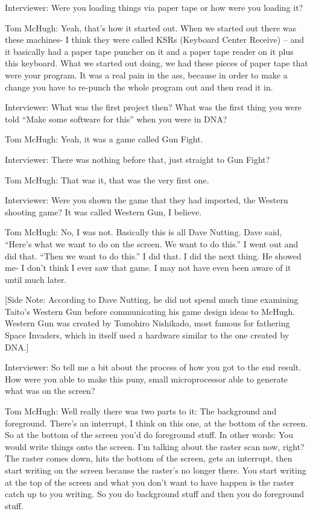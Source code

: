 \textcolor{interviewer}{Interviewer:} Were you loading things via paper tape or how were you loading it?

\textcolor{interviewee}{Tom McHugh:} Yeah, that’s how it started out. When we started out there was these machines- I think they were called KSRs (Keyboard Center Receive) – and it basically had a paper tape puncher on it and a paper tape reader on it plus this keyboard. What we started out doing, we had these pieces of paper tape that were your program. It was a real pain in the ass, because in order to make a change you have to re-punch the whole program out and then read it in.

\textcolor{interviewer}{Interviewer:} What was the first project then? What was the first thing you were told “Make some software for this” when you were in DNA?

\textcolor{interviewee}{Tom McHugh:} Yeah, it was a game called Gun Fight.

\textcolor{interviewer}{Interviewer:} There was nothing before that, just straight to Gun Fight?

\textcolor{interviewee}{Tom McHugh:} That was it, that was the very first one.

\textcolor{interviewer}{Interviewer:} Were you shown the game that they had imported, the Western shooting game? It was called Western Gun, I believe.

\textcolor{interviewee}{Tom McHugh:} No, I was not. Basically this is all Dave Nutting. Dave said, “Here’s what we want to do on the screen. We want to do this.” I went out and did that. “Then we want to do this.” I did that. I did the next thing. He showed me- I don’t think I ever saw that game. I may not have even been aware of it until much later.

[Side Note: According to Dave Nutting, he did not spend much time examining Taito’s Western Gun before communicating his game design ideas to McHugh. Western Gun was created by Tomohiro Nishikado, most famous for fathering Space Invaders, which in itself used a hardware similar to the one created by DNA.]

\textcolor{interviewer}{Interviewer:} So tell me a bit about the process of how you got to the end result. How were you able to make this puny, small microprocessor able to generate what was on the screen?

\textcolor{interviewee}{Tom McHugh:} Well really there was two parts to it: The background and foreground. There’s an interrupt, I think on this one, at the bottom of the screen. So at the bottom of the screen you’d do foreground stuff. In other words: You would write things onto the screen. I’m talking about the raster scan now, right? The raster comes down, hits the bottom of the screen, gets an interrupt, then start writing on the screen because the raster’s no longer there. You start writing at the top of the screen and what you don’t want to have happen is the raster catch up to you writing. So you do background stuff and then you do foreground stuff.

